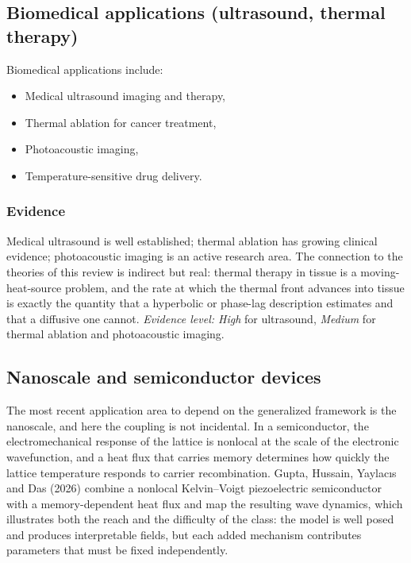 \subsection{Biomedical applications (ultrasound, thermal therapy)}
\label{sec:13.5}

Biomedical applications include:
\begin{itemize}
\item Medical ultrasound imaging and therapy,
\item Thermal ablation for cancer treatment,
\item Photoacoustic imaging,
\item Temperature-sensitive drug delivery.
\end{itemize}

\subsubsection{Evidence}
Medical ultrasound is well established; thermal ablation has growing clinical evidence; photoacoustic imaging is an active research area. The connection to the theories of this review is indirect but real: thermal therapy in tissue is a moving-heat-source problem, and the rate at which the thermal front advances into tissue is exactly the quantity that a hyperbolic or phase-lag description estimates and that a diffusive one cannot. \emph{Evidence level: High} for ultrasound, \emph{Medium} for thermal ablation and photoacoustic imaging.

\subsection{Nanoscale and semiconductor devices}
\label{sec:13.6}

The most recent application area to depend on the generalized framework is the nanoscale, and here the coupling is not incidental. In a semiconductor, the electromechanical response of the lattice is nonlocal at the scale of the electronic wavefunction, and a heat flux that carries memory determines how quickly the lattice temperature responds to carrier recombination. Gupta, Hussain, Yaylac{\i s} and Das (2026) \cite{Gupta2026HeatMap} combine a nonlocal Kelvin--Voigt piezoelectric semiconductor with a memory-dependent heat flux and map the resulting wave dynamics, which illustrates both the reach and the difficulty of the class: the model is well posed and produces interpretable fields, but each added mechanism contributes parameters that must be fixed independently.


